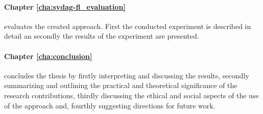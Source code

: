 \paragraph{Chapter \ref{cha:sydag-fl_evaluation}} evaluates the created approach. First the conducted experiment is described in detail an secondly the results of the experiment are presented.

\paragraph{Chapter \ref{cha:conclusion}} concludes the thesis by firstly interpreting and discussing the results, secondly summarizing and outlining the practical and theoretical significance of the research contributions, thirdly discussing the ethical and social aspects of the use of the approach and, fourthly suggesting directions for future work.